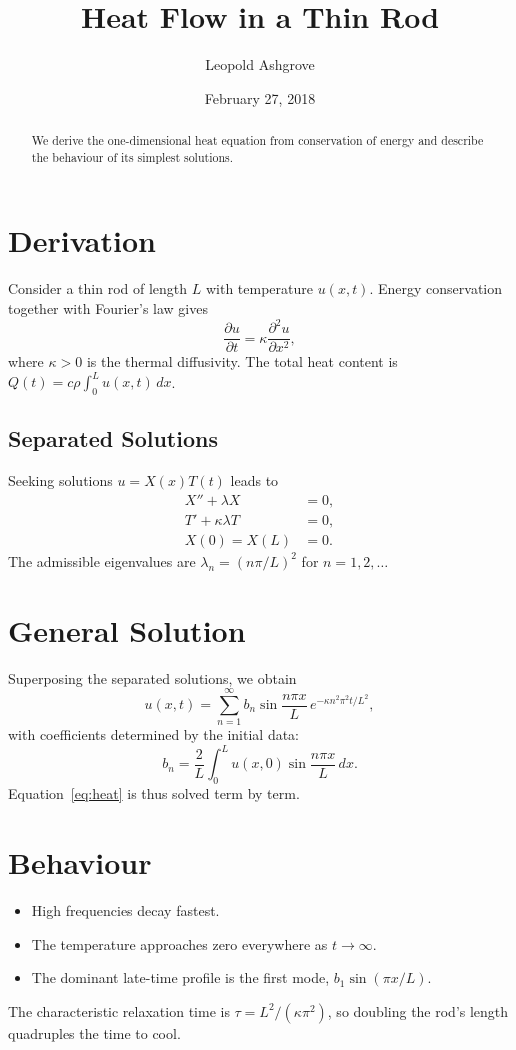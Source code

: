 \documentclass[12pt,a4paper]{article}
\title{Heat Flow in a Thin Rod}
\author{Leopold Ashgrove}
\date{February 27, 2018}
\begin{document}
\maketitle

\begin{abstract}
We derive the one-dimensional heat equation from conservation of energy and
describe the behaviour of its simplest solutions.
\end{abstract}

\section{Derivation}
Consider a thin rod of length $L$ with temperature $u(x,t)$. Energy
conservation together with Fourier's law gives
\begin{equation}\label{eq:heat}
\frac{\partial u}{\partial t} = \kappa \frac{\partial^2 u}{\partial x^2},
\end{equation}
where $\kappa > 0$ is the thermal diffusivity. The total heat content is
$Q(t) = c\rho \int_0^L u(x,t)\,dx$.

\subsection{Separated Solutions}
Seeking solutions $u = X(x)T(t)$ leads to
\begin{align*}
X'' + \lambda X &= 0, \\
T' + \kappa\lambda T &= 0, \\
X(0) = X(L) &= 0.
\end{align*}
The admissible eigenvalues are $\lambda_n = (n\pi/L)^2$ for $n = 1, 2, \dots$

\section{General Solution}
Superposing the separated solutions, we obtain
\[
u(x,t) = \sum_{n=1}^{\infty} b_n \sin\frac{n\pi x}{L}\, e^{-\kappa n^2\pi^2 t/L^2},
\]
with coefficients determined by the initial data:
\begin{equation}
b_n = \frac{2}{L}\int_0^L u(x,0)\sin\frac{n\pi x}{L}\,dx.
\end{equation}
Equation~\eqref{eq:heat} is thus solved term by term.

\section{Behaviour}
\begin{itemize}
\item[$\bullet$] High frequencies decay fastest.
\item[(a)] The temperature approaches zero everywhere as $t \to \infty$.
\item[(b)] The dominant late-time profile is the first mode,
  $b_1 \sin(\pi x/L)$.
\end{itemize}
The characteristic relaxation time is $\tau = L^2/(\kappa\pi^2)$, so
doubling the rod's length quadruples the time to cool.
\end{document}
